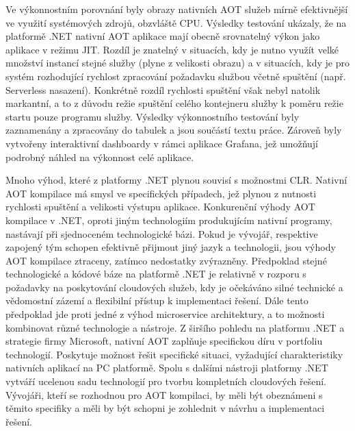 Ve výkonnostním porovnání byly obrazy nativních AOT služeb mírně efektivnější ve využití systémových zdrojů, obzvláště CPU. Výsledky testování ukázaly, že na platformě .NET nativní AOT aplikace mají obecně srovnatelný výkon jako aplikace v režimu JIT. Rozdíl je znatelný v situacích, kdy je nutno využít velké množství instancí stejné služby (plyne z velikosti obrazu) a v situacích, kdy je pro systém rozhodující rychlost zpracování požadavku službou včetně spuštění (např. Serverless nasazení). Konkrétně rozdíl rychlosti spuštění však nebyl natolik markantní, a to z důvodu režie spuštění celého kontejneru služby k poměru režie startu pouze programu služby. Výsledky výkonnostního testování byly zaznamenány a zpracovány do tabulek a jsou součástí textu práce. Zároveň byly vytvořeny interaktivní dashboardy v rámci aplikace Grafana, jež umožňují podrobný náhled na výkonnost celé aplikace. 

Mnoho výhod, které z platformy .NET plynou souvisí s možnostmi CLR. Nativní AOT kompilace má smysl ve specifických případech, jež plynou z nutnosti rychlosti spuštění a velikosti výstupu aplikace. Konkurenční výhody AOT kompilace v .NET, oproti jiným technologiím produkujícím nativní programy, nastávají při sjednoceném technologické bázi. Pokud je vývojář, respektive zapojený tým schopen efektivně přijmout jiný jazyk a technologii, jsou výhody AOT kompilace ztraceny, zatímco nedostatky zvýrazněny. Předpoklad stejné technologické a kódové báze na platformě .NET je relativně v rozporu s požadavky na poskytování cloudových služeb, kdy je očekáváno silné technické a vědomostní zázemí a flexibilní přístup k implementaci řešení. Dále tento předpoklad jde proti jedné z výhod microservice architektury, a to možnosti kombinovat různé technologie a nástroje. Z širšího pohledu na platformu .NET a strategie firmy Microsoft, nativní AOT zaplňuje specifickou díru v portfoliu technologií. Poskytuje možnost řešit specifické situaci, vyžadující charakteristiky nativních aplikací na PC platformě. Spolu s dalšími nástroji platformy .NET vytváří ucelenou sadu technologií pro tvorbu kompletních cloudových řešení. Vývojáři, kteří se rozhodnou pro AOT kompilaci, by měli být obeznámeni s těmito specifiky a měli by být schopni je zohlednit v návrhu a implementaci řešení.

